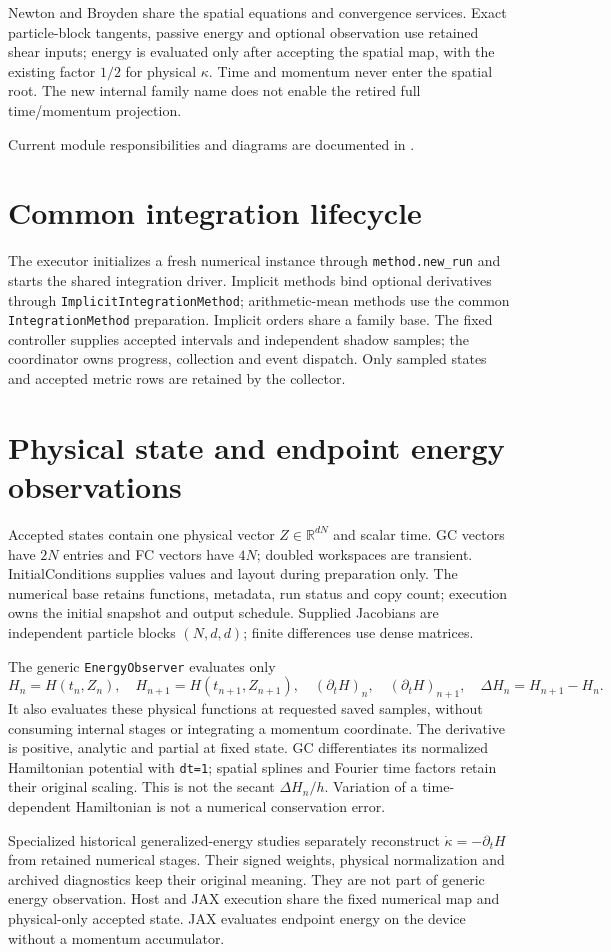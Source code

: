\documentclass[11pt,a4paper]{article}
\begin{document}
Newton and Broyden share the spatial equations and convergence services.
Exact particle-block tangents, passive energy and optional observation use
retained shear inputs; energy is evaluated only after accepting the spatial
map, with the existing factor $1/2$ for physical $\kappa$. Time and momentum
never enter the spatial root. The new internal family name does not enable
the retired full time/momentum projection.

Current module responsibilities and diagrams are documented in
.

\section{Common integration lifecycle}
The executor initializes a fresh numerical instance through
\texttt{method.new\_run} and starts the shared integration driver.
Implicit methods bind optional derivatives through
\texttt{ImplicitIntegrationMethod}; arithmetic-mean methods use the common
\texttt{IntegrationMethod} preparation. Implicit orders share a family base.
The fixed controller supplies accepted intervals and independent shadow
samples; the coordinator owns progress, collection and event dispatch.
Only sampled states and accepted metric rows are retained by the collector.
\clearpage
\section{Physical state and endpoint energy observations}
Accepted states contain one physical vector $Z\in\mathbb{R}^{dN}$ and scalar time.
GC vectors have $2N$ entries and FC vectors have $4N$; doubled workspaces are
transient. InitialConditions supplies values and layout during preparation only.
The numerical base retains functions, metadata, run status and copy count;
execution owns the initial snapshot and output schedule. Supplied Jacobians are
independent particle blocks $(N,d,d)$; finite differences use dense matrices.

The generic \texttt{EnergyObserver} evaluates only
\[
 H_n=H(t_n,Z_n),\quad H_{n+1}=H(t_{n+1},Z_{n+1}),\quad
 (\partial_tH)_n,\quad (\partial_tH)_{n+1},\quad
 \Delta H_n=H_{n+1}-H_n.
\]
It also evaluates these physical functions at requested saved samples, without
consuming internal stages or integrating a momentum coordinate. The derivative
is positive, analytic and partial at fixed state. GC differentiates its normalized
Hamiltonian potential with \texttt{dt=1}; spatial splines and Fourier time factors
retain their original scaling. This is not the secant $\Delta H_n/h$.
Variation of a time-dependent Hamiltonian is not a numerical conservation error.

Specialized historical generalized-energy studies separately reconstruct
$\dot\kappa=-\partial_tH$ from retained numerical stages. Their signed weights,
physical normalization and archived diagnostics keep their original meaning.
They are not part of generic energy observation. Host and JAX execution share
the fixed numerical map and physical-only accepted state. JAX evaluates endpoint
energy on the device without a momentum accumulator.
\end{document}
